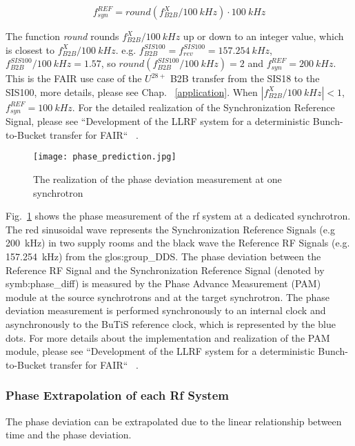 \begin{equation}
\label{round}
	f_\mathit{syn}^\mathit{REF}=\textit{round} (f_\mathit{B2B}^{X}/\SI{100}{kHz})\cdot \SI{100}{kHz}
\end{equation}

The function \textit{round} rounds $f_\mathit{B2B}^{X}/\SI{100}{kHz}$ up or down to an integer value, which is closest to $f_\mathit{B2B}^{X}/\SI{100}{kHz}$. e.g. $f_\mathit{B2B}^{SIS100}=f_\mathit{rev}^{SIS100}=\SI{157.254}{kHz}$, $f_\mathit{B2B}^{SIS100}/\SI{100}{kHz}=1.57$, so $\textit{round} (f_\mathit{B2B}^{SIS100}/\SI{100}{kHz})=2$ and $f_\mathit{syn}^\mathit{REF}=\SI{200}{kHz}$. This is the FAIR use case of the $U^{28+}$ B2B transfer from the SIS18 to the SIS100, more details, please see Chap. ~\ref{application}. When $|f_\mathit{B2B}^{X}/\SI{100}{kHz}|<1$, $f_\mathit{syn}^\mathit{REF}=\SI{100}{kHz}$.  For the detailed realization of the Synchronization Reference Signal, please see ``Development of the LLRF system for a deterministic Bunch-to-Bucket transfer for FAIR`` ~\cite{ferrand_development_????}.

\begin{figure}[!htb]
   \centering   
   \texttt{[image: phase\_prediction.jpg]}
   \caption{The realization of the phase deviation measurement at one synchrotron}
   \label{phase_prediction}
\end{figure}

Fig.~\ref{phase_prediction} shows the phase measurement of the rf system at a dedicated synchrotron. The red sinusoidal wave represents the Synchronization Reference Signals (e.g \SI{200}{kHz}) in two supply rooms and the black wave the Reference RF Signals (e.g. \SI{157.254}{kHz}) from the \gls{glos:group_DDS}. The phase deviation between the Reference RF Signal and the Synchronization Reference Signal (denoted by \gls{symb:phase_diff}) is measured by the Phase Advance Measurement (\gls{PAM}) module at the source synchrotrons and at the target synchrotron. The phase deviation measurement is performed synchronously to an internal clock and asynchronously to the BuTiS reference clock, which is represented by the blue dots. For more details about the implementation and realization of the PAM module, please see ``Development of the LLRF system for a deterministic Bunch-to-Bucket transfer for FAIR`` ~\cite{ferrand_development_????}. 
\subsubsection{Phase Extrapolation of each Rf System}
The phase deviation can be extrapolated due to the linear relationship between time and the phase deviation. 

